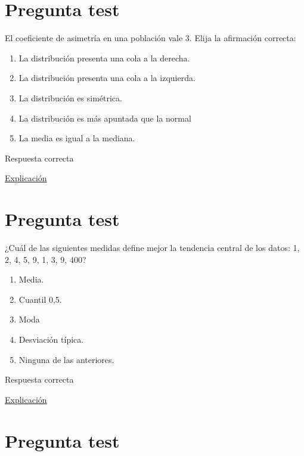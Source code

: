 \documentclass[
]{book}
\providecommand{\tightlist}{%
  \setlength{\itemsep}{0pt}\setlength{\parskip}{0pt}}
\begin{document}
\hypertarget{pregunta-test-85}{%
\section{Pregunta test}\label{pregunta-test-85}}

El coeficiente de asimetría en una población vale 3. Elija la afirmación correcta:

\begin{enumerate}
\def\labelenumi{\alph{enumi})}
\tightlist
\item
  La distribución presenta una cola a la derecha.
\item
  La distribución presenta una cola a la izquierda.
\item
  La distribución es simétrica.
\item
  La distribución es más apuntada que la normal
\item
  La media es igual a la mediana.
\end{enumerate}

Respuesta correcta

\href{https://1fjmanzano.github.io/bioestadistica/medidas-de-forma.html}{Explicación}

\hypertarget{pregunta-test-86}{%
\section{Pregunta test}\label{pregunta-test-86}}

¿Cuál de las siguientes medidas define mejor la tendencia central de los datos: 1, 2, 4, 5, 9, 1, 3, 9, 400?

\begin{enumerate}
\def\labelenumi{\alph{enumi})}
\tightlist
\item
  Media.
\item
  Cuantil 0,5.
\item
  Moda
\item
  Desviación típica.
\item
  Ninguna de las anteriores.
\end{enumerate}

Respuesta correcta

\href{https://1fjmanzano.github.io/bioestadistica/medidas-de-posicio\%CC\%81n-dispersio\%CC\%81n-y-forma.html\#medidas-de-posicio\%CC\%81n-no-centrales}{Explicación}

\hypertarget{pregunta-test-87}{%
\section{Pregunta test}\label{pregunta-test-87}}
\end{document}
